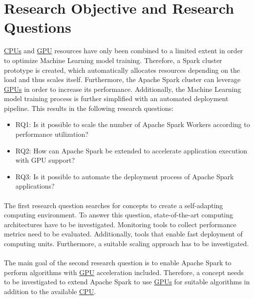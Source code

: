 \section{Research Objective and Research Questions}
\hyperlink{abbr:cpu}{CPUs} and \hyperlink{abbr:gpu}{GPU} resources have only been combined to a limited extent in order to optimize Machine Learning model training. Therefore, a Spark cluster prototype is created, which automatically allocates resources depending on the load and thus scales itself. Furthermore, the Apache Spark cluster can leverage \hyperlink{abbr:gpu}{GPUs} in order to increase its performance.
Additionally, the Machine Learning model training process is further simplified with an automated deployment pipeline.
This results in the following research questions:
\begin{itemize}
\item RQ1: Is it possible to scale the number of Apache Spark Workers according to performance utilization?
\item RQ2: How can Apache Spark be extended to accelerate application execution with GPU support?
\item RQ3: Is it possible to automate the deployment process of Apache Spark applications?
\end{itemize}


\paragraph{}
The first research question searches for concepts to create a self-adapting computing environment.
To answer this question, state-of-the-art computing architectures have to be investigated.
Monitoring tools to collect performance metrics need to be evaluated. Additionally, tools that enable fast deployment of computing units.
Furthermore, a suitable scaling approach has to be investigated.


\paragraph{}
The main goal of the second research question is to enable Apache Spark to perform algorithms with \hyperlink{abbr:gpu}{GPU} acceleration included.
Therefore, a concept needs to be investigated to extend Apache Spark to use \hyperlink{abbr:gpu}{GPUs} for suitable algorithms in addition to the available \hyperlink{abbr:cpu}{CPU}.


